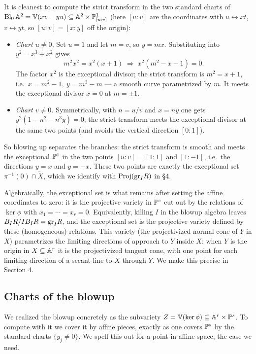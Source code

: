 \documentclass[11pt]{article}
\begin{document}
It is cleanest to compute the strict transform in the two standard charts of $\Bl_0 \A^2 = \V(xv - yu) \subseteq \A^2 \times \P^1_{[u:v]}$ (here $[u:v]$ are the coordinates with $u \leftrightarrow xt$, $v \leftrightarrow yt$, so $[u:v]=[x:y]$ off the origin):
\begin{itemize}[topsep=2pt,itemsep=2pt]
    \item \emph{Chart $u \neq 0$.} Set $u=1$ and let $m = v$, so $y = mx$. Substituting into $y^2 = x^3+x^2$ gives
    \[m^2x^2 = x^2(x+1) \;\Longrightarrow\; x^2(m^2 - x - 1) = 0.\]
    The factor $x^2$ is the exceptional divisor; the strict transform is $m^2 = x+1$, i.e.\ $x = m^2-1,\ y = m^3 - m$ --- a smooth curve parametrized by $m$. It meets the exceptional divisor $x=0$ at $m = \pm 1$.
    \item \emph{Chart $v \neq 0$.} Symmetrically, with $n = u/v$ and $x = ny$ one gets $y^2(1 - n^2 - n^3 y)=0$; the strict transform meets the exceptional divisor at the same two points (and avoids the vertical direction $[0:1]$).
\end{itemize}
So blowing up separates the branches: the strict transform is smooth and meets the exceptional $\P^1$ in the two points $[u:v] = [1:1]$ and $[1:-1]$, i.e.\ the directions $y = x$ and $y = -x$. These two points are exactly the exceptional set $\pi^{-1}(0)\cap \widetilde X$, which we identify with $\Proj(\gr_I R)$ in \S4.

\newpage


Algebraically, the exceptional set is what remains after setting the affine coordinates to zero: it is the projective variety in $\P^s$ cut out by the relations of $\ker\phi$ with $x_1 = \cdots = x_r = 0$. Equivalently, killing $I$ in the blowup algebra leaves $B_I R / I B_I R = \gr_I R$, and the exceptional set is the projective variety defined by these (homogeneous) relations. This variety (the projectivized normal cone of $Y$ in $X$) parametrizes the limiting directions of approach to $Y$ inside $X$: when $Y$ is the origin in $X \subseteq \A^r$ it is the projectivized tangent cone, with one point for each limiting direction of a secant line to $X$ through $Y$. We make this precise in Section 4.
 
\subsection*{Charts of the blowup}
 
We realized the blowup concretely as the subvariety $Z = \V(\ker\phi) \subseteq \A^r \times \P^s$. To compute with it we cover it by affine pieces, exactly as one covers $\P^s$ by the standard charts $\{y_j \neq 0\}$. We spell this out for a point in affine space, the case we need.
 
\end{document}
